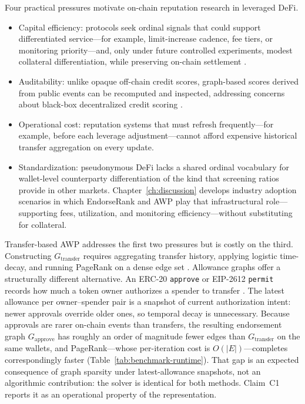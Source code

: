 Four practical pressures motivate on-chain reputation research in leveraged DeFi.
\begin{itemize}
\item Capital efficiency: protocols seek ordinal signals that could support differentiated service---for example, limit-increase cadence, fee tiers, or monitoring priority---and, only under future controlled experiments, modest collateral differentiation, while preserving on-chain settlement .
\item Auditability: unlike opaque off-chain credit scores, graph-based scores derived from public events can be recomputed and inspected, addressing concerns about black-box decentralized credit scoring .
\item Operational cost: reputation systems that must refresh frequently---for example, before each leverage adjustment---cannot afford expensive historical transfer aggregation on every update.
\item Standardization: pseudonymous DeFi lacks a shared ordinal vocabulary for wallet-level counterparty differentiation of the kind that screening ratios provide in other markets. Chapter~\ref{ch:discussion} develops industry adoption scenarios in which EndorseRank and AWP play that infrastructural role---supporting fees, utilization, and monitoring efficiency---without substituting for collateral.
\end{itemize}

Transfer-based AWP addresses the first two pressures but is costly on the third. Constructing $G_{\text{transfer}}$ requires aggregating transfer history, applying logistic time-decay, and running PageRank on a dense edge set . Allowance graphs offer a structurally different alternative. An ERC-20 \texttt{approve} or EIP-2612 \texttt{permit} records how much a token owner authorizes a spender to transfer . The latest allowance per owner--spender pair is a snapshot of current authorization intent: newer approvals override older ones, so temporal decay is unnecessary. Because approvals are rarer on-chain events than transfers, the resulting endorsement graph $G_{\text{approve}}$ has roughly an order of magnitude fewer edges than $G_{\text{transfer}}$ on the same wallets, and PageRank---whose per-iteration cost is $O(|E|)$---completes correspondingly faster (Table~\ref{tab:benchmark-runtime}). That gap is an expected consequence of graph sparsity under latest-allowance snapshots, not an algorithmic contribution: the solver is identical for both methods. Claim~C1 reports it as an operational property of the representation.

